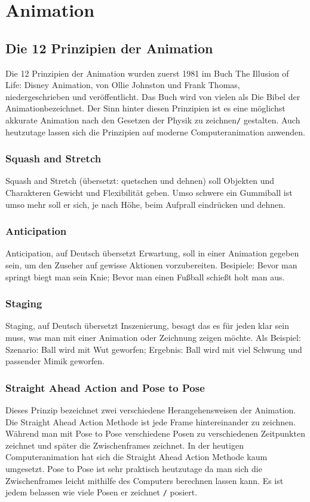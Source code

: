 \section{Animation}
\subsection{Die 12 Prinzipien der Animation}
\label{animation:principles}
Die 12 Prinzipien der Animation wurden zuerst 1981 im Buch \dq The Illusion of Life: Disney Animation\dq, von Ollie Johnston und Frank Thomas,
niedergeschrieben und veröffentlicht. Das Buch wird von vielen als \dq Die Bibel der Animation\dq bezeichnet. Der Sinn hinter diesen Prinzipien ist es eine möglichst
akkurate Animation nach den Gesetzen der Physik zu zeichnen\verb-/- gestalten. Auch heutzutage lassen sich die Prinzipien auf moderne Computeranimation anwenden.
\citep{Blender:twelvePrinciplesOfAnimation}

\subsubsection{Squash and Stretch}
Squash and Stretch (übersetzt: quetschen und dehnen) soll Objekten und Charakteren Gewicht und Flexibilität geben.
 Umso schwere ein Gummiball ist umso mehr soll er sich, je nach Höhe, beim Aufprall eindrücken und dehnen.

\subsubsection{Anticipation}
Anticipation, auf Deutsch übersetzt \dq Erwartung\dq, soll in einer Animation gegeben sein, um den Zuseher auf gewisse Aktionen vorzubereiten.
Besipiele: Bevor man springt biegt man sein Knie; Bevor man einen Fußball schießt holt man aus.

\subsubsection{Staging}
Staging, auf Deutsch übersetzt \dq Inszenierung\dq, besagt das es für jeden klar sein muss, was man mit einer Animation oder Zeichnung zeigen möchte.
Als Beispiel: Szenario: Ball wird mit Wut geworfen; Ergebnis: Ball wird mit viel Schwung und passender Mimik geworfen.

\subsubsection{Straight Ahead Action and Pose to Pose}
Dieses Prinzip bezeichnet zwei verschiedene Herangehensweisen der Animation. Die Straight Ahead Action Methode ist jede Frame hintereinander zu zeichnen.
Während man mit Pose to Pose verschiedene Posen zu verschiedenen Zeitpunkten zeichnet und später die Zwischenframes zeichnet.
In der heutigen Computeranimation hat sich die Straight Ahead Action Methode kaum umgesetzt.
Pose to Pose ist sehr praktisch heutzutage da man sich die Zwischenframes leicht mithilfe des Computers berechnen lassen kann. Es ist jedem belassen wie viele Posen er zeichnet \verb-/- posiert.

